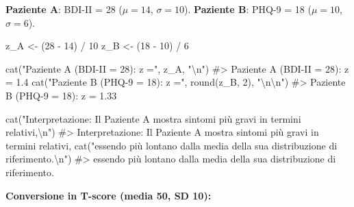 \documentclass[
  italian,
  letterpaper,
  a4paper,
  11pt,
  open=any]{scrbook}
\newenvironment{Shaded}{\begin{snugshade}}{\end{snugshade}}
\newcommand{\CommentTok}[1]{\textcolor[rgb]{0.37,0.37,0.37}{#1}}
\newcommand{\DecValTok}[1]{\textcolor[rgb]{0.68,0.00,0.00}{#1}}
\newcommand{\FunctionTok}[1]{\textcolor[rgb]{0.28,0.35,0.67}{#1}}
\newcommand{\NormalTok}[1]{\textcolor[rgb]{0.00,0.23,0.31}{#1}}
\newcommand{\OtherTok}[1]{\textcolor[rgb]{0.00,0.23,0.31}{#1}}
\newcommand{\SpecialCharTok}[1]{\textcolor[rgb]{0.37,0.37,0.37}{#1}}
\newcommand{\StringTok}[1]{\textcolor[rgb]{0.13,0.47,0.30}{#1}}
\theoremstyle{plain}
\theoremstyle{definition}
\theoremstyle{definition}
\theoremstyle{remark}
\begin{document}
\begin{tcolorbox}[enhanced jigsaw, arc=.35mm, bottomrule=.15mm, bottomtitle=1mm, breakable, colback=white, colbacktitle=quarto-callout-note-color!10!white, colframe=quarto-callout-note-color-frame, coltitle=black, left=2mm, leftrule=.75mm, opacityback=0, opacitybacktitle=0.6, rightrule=.15mm, title=\textcolor{quarto-callout-note-color}{\faInfo}\hspace{0.5em}{Esempio: confronto tra scale psicometriche diverse}, titlerule=0mm, toprule=.15mm, toptitle=1mm]

\textbf{Paziente A}: BDI-II = 28 (\(\mu = 14\), \(\sigma = 10\)).
\textbf{Paziente B}: PHQ-9 = 18 (\(\mu = 10\), \(\sigma = 6\)).

\begin{Shaded}
\begin{Highlighting}[]
\NormalTok{z\_A }\OtherTok{\textless{}{-}}\NormalTok{ (}\DecValTok{28} \SpecialCharTok{{-}} \DecValTok{14}\NormalTok{) }\SpecialCharTok{/} \DecValTok{10}
\NormalTok{z\_B }\OtherTok{\textless{}{-}}\NormalTok{ (}\DecValTok{18} \SpecialCharTok{{-}} \DecValTok{10}\NormalTok{) }\SpecialCharTok{/} \DecValTok{6}

\FunctionTok{cat}\NormalTok{(}\StringTok{"Paziente A (BDI{-}II = 28): z ="}\NormalTok{, z\_A, }\StringTok{"}\SpecialCharTok{\textbackslash{}n}\StringTok{"}\NormalTok{)}
\CommentTok{\#\textgreater{} Paziente A (BDI{-}II = 28): z = 1.4}
\FunctionTok{cat}\NormalTok{(}\StringTok{"Paziente B (PHQ{-}9 = 18): z ="}\NormalTok{, }\FunctionTok{round}\NormalTok{(z\_B, }\DecValTok{2}\NormalTok{), }\StringTok{"}\SpecialCharTok{\textbackslash{}n\textbackslash{}n}\StringTok{"}\NormalTok{)}
\CommentTok{\#\textgreater{} Paziente B (PHQ{-}9 = 18): z = 1.33}

\FunctionTok{cat}\NormalTok{(}\StringTok{"Interpretazione: Il Paziente A mostra sintomi più gravi in termini relativi,}\SpecialCharTok{\textbackslash{}n}\StringTok{"}\NormalTok{)}
\CommentTok{\#\textgreater{} Interpretazione: Il Paziente A mostra sintomi più gravi in termini relativi,}
\FunctionTok{cat}\NormalTok{(}\StringTok{"essendo più lontano dalla media della sua distribuzione di riferimento.}\SpecialCharTok{\textbackslash{}n}\StringTok{"}\NormalTok{)}
\CommentTok{\#\textgreater{} essendo più lontano dalla media della sua distribuzione di riferimento.}
\end{Highlighting}
\end{Shaded}

\textbf{Conversione in T-score (media 50, SD 10):}


\end{tcolorbox}
\end{document}
